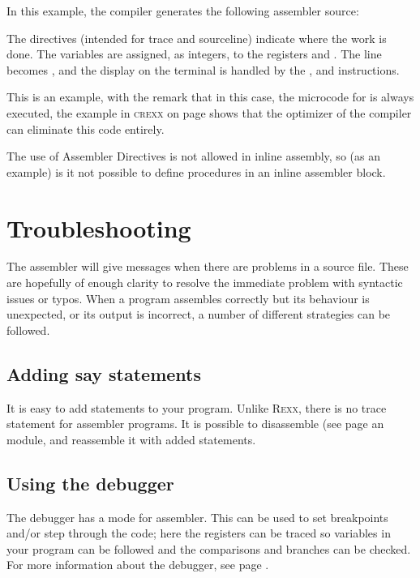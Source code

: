 In this example, the compiler generates the following assembler source:


The  directives (intended for trace and sourceline) indicate where the work is done. The
variables are assigned, as integers, to the registers  and
. The line  becomes , and the display on the terminal is handled by the
, and  instructions.

This is an example, with the remark that in this case, the microcode
for  is always executed, the example in \textsc{crexx} on
page \pageref{fpowexample} shows that the \crexx{} optimizer of the
compiler can eliminate this code entirely.

The use of Assembler Directives is not allowed in inline assembly, so
(as an example) is it not possible to define procedures in an inline
assembler block.

\section{Troubleshooting}
The assembler will give messages when there are problems in a source
file. These are hopefully of enough clarity to resolve the immediate
problem with syntactic issues or typos. When a program assembles
correctly but its behaviour is unexpected, or its output is incorrect,
a number of different strategies can be followed.

\subsection{Adding say statements}
It is easy to add  statements to your program. Unlike
\textsc{Rexx}, there is no trace statement for assembler programs. It
is possible to disassemble (see page \pageref{disassembler} an  module, and reassemble it
with added statements.

\subsection{Using the debugger}
The  debugger has a mode for assembler. This can be used to
set breakpoints and/or step through the code; here the registers can
be traced so variables in your program can be followed and the
comparisons and branches can be checked. For more information about the
debugger, see page \pageref{debugger}.


